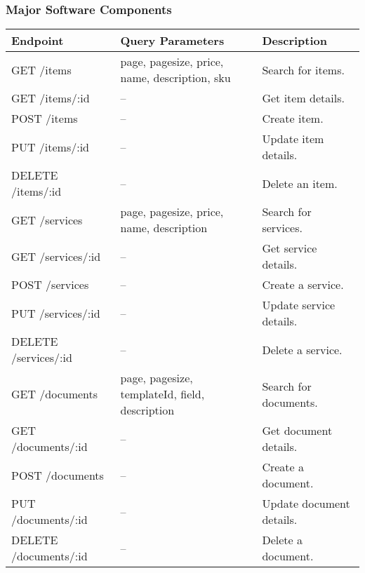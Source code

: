 \documentclass{article}
\begin{document}

\subsubsection{Major Software Components}
\label{msc}

\begin{table}
    \centering
    \begin{tabular}{|l|p{4.5cm}|l|}\hline
        Endpoint & Query Parameters & Description\\\hline\hline
         GET /items & page, pagesize, price, name, description, sku & Search for items. \\\hline
         GET /items/:id & -- & Get item details. \\\hline
         POST /items & -- & Create item. \\\hline
         PUT /items/:id & -- & Update item details. \\\hline
         DELETE /items/:id & -- & Delete an item. \\\hline
         GET /services & page, pagesize, price, name, description & Search for services. \\\hline
         GET /services/:id & -- & Get service details. \\\hline
         POST /services & -- & Create a service. \\\hline
         PUT /services/:id & -- & Update service details. \\\hline
         DELETE /services/:id & -- & Delete a service. \\\hline
         GET /documents & page, pagesize, templateId, field, description & Search for documents. \\\hline
         GET /documents/:id & -- & Get document details. \\\hline
         POST /documents & -- & Create a document. \\\hline
         PUT /documents/:id & -- & Update document details. \\\hline
         DELETE /documents/:id & -- & Delete a document. \\\hline

\end{tabular}
\end{table}
\end{document}
